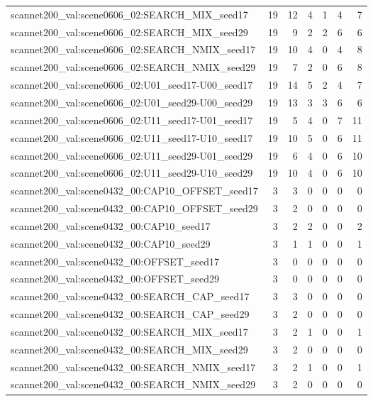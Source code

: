 \begin{table}[t]
\begin{tabular}{lrrrrrr}
scannet200\_val:scene0606\_02:SEARCH\_MIX\_seed17 & 19 & 12 & 4 & 1 & 4 & 7 \\
scannet200\_val:scene0606\_02:SEARCH\_MIX\_seed29 & 19 & 9 & 2 & 2 & 6 & 6 \\
scannet200\_val:scene0606\_02:SEARCH\_NMIX\_seed17 & 19 & 10 & 4 & 0 & 4 & 8 \\
scannet200\_val:scene0606\_02:SEARCH\_NMIX\_seed29 & 19 & 7 & 2 & 0 & 6 & 8 \\
scannet200\_val:scene0606\_02:U01\_seed17-U00\_seed17 & 19 & 14 & 5 & 2 & 4 & 7 \\
scannet200\_val:scene0606\_02:U01\_seed29-U00\_seed29 & 19 & 13 & 3 & 3 & 6 & 6 \\
scannet200\_val:scene0606\_02:U11\_seed17-U01\_seed17 & 19 & 5 & 4 & 0 & 7 & 11 \\
scannet200\_val:scene0606\_02:U11\_seed17-U10\_seed17 & 19 & 10 & 5 & 0 & 6 & 11 \\
scannet200\_val:scene0606\_02:U11\_seed29-U01\_seed29 & 19 & 6 & 4 & 0 & 6 & 10 \\
scannet200\_val:scene0606\_02:U11\_seed29-U10\_seed29 & 19 & 10 & 4 & 0 & 6 & 10 \\
scannet200\_val:scene0432\_00:CAP10\_OFFSET\_seed17 & 3 & 3 & 0 & 0 & 0 & 0 \\
scannet200\_val:scene0432\_00:CAP10\_OFFSET\_seed29 & 3 & 2 & 0 & 0 & 0 & 0 \\
scannet200\_val:scene0432\_00:CAP10\_seed17 & 3 & 2 & 2 & 0 & 0 & 2 \\
scannet200\_val:scene0432\_00:CAP10\_seed29 & 3 & 1 & 1 & 0 & 0 & 1 \\
scannet200\_val:scene0432\_00:OFFSET\_seed17 & 3 & 0 & 0 & 0 & 0 & 0 \\
scannet200\_val:scene0432\_00:OFFSET\_seed29 & 3 & 0 & 0 & 0 & 0 & 0 \\
scannet200\_val:scene0432\_00:SEARCH\_CAP\_seed17 & 3 & 3 & 0 & 0 & 0 & 0 \\
scannet200\_val:scene0432\_00:SEARCH\_CAP\_seed29 & 3 & 2 & 0 & 0 & 0 & 0 \\
scannet200\_val:scene0432\_00:SEARCH\_MIX\_seed17 & 3 & 2 & 1 & 0 & 0 & 1 \\
scannet200\_val:scene0432\_00:SEARCH\_MIX\_seed29 & 3 & 2 & 0 & 0 & 0 & 0 \\
scannet200\_val:scene0432\_00:SEARCH\_NMIX\_seed17 & 3 & 2 & 1 & 0 & 0 & 1 \\
scannet200\_val:scene0432\_00:SEARCH\_NMIX\_seed29 & 3 & 2 & 0 & 0 & 0 & 0 \\

\end{tabular}
\end{table}
